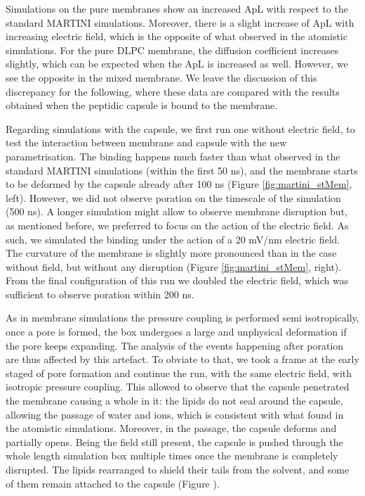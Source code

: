 Simulations on the pure membranes show an increased ApL with respect to the standard MARTINI simulations. Moreover, there is a slight increase of ApL with increasing electric field, which is the opposite of what observed in the atomistic simulations.
%
For the pure DLPC membrane, the diffusion coefficient increases slightly, which can be expected when the ApL is increased as well. However, we see the opposite in the mixed membrane. We leave the discussion of this discrepancy for the following, where these data are compared with the results obtained when the peptidic capsule is bound to the membrane.

Regarding simulations with the capsule, we first run one without electric field, to test the interaction between membrane and capsule with the new parametrisation. The binding happens much faster than what observed in the standard MARTINI simulations (within the first 50 ns), and the membrane starts to be deformed by the capsule already after 100 ns (Figure \ref{fig:martini_stMem}, left). However, we did not observe poration on the timescale of the simulation (500 ns).
%
A longer simulation might allow to observe membrane disruption but, as mentioned before, we preferred to focus on the action of the electric field. As such, we simulated the binding under the action of a 20 mV/nm electric field. The curvature of the membrane is slightly more pronounced than in the case without field, but without any disruption (Figure \ref{fig:martini_stMem}, right).
From the final configuration of this run we doubled the electric field, which was sufficient to observe poration within 200 ns.

As in membrane simulations the pressure coupling is performed semi isotropically, once a pore is formed, the box undergoes a large and unphysical deformation if the pore keeps expanding. The analysis of the events happening after poration are thus affected by this artefact.
%
To obviate to that, we took a frame at the early staged of pore formation and continue the run, with the same electric field, with isotropic pressure coupling. This allowed to observe that the capsule penetrated the membrane causing a whole in it: the lipids do not seal around the capsule, allowing the passage of water and ions, which is consistent with what found in the atomistic simulations. Moreover, in the passage, the capsule deforms and partially opens.
%
Being the field still present, the capsule is pushed through the whole length simulation box multiple times once the membrane is completely disrupted. The lipids rearranged to shield their tails from the solvent, and some of them remain attached to the capsule (Figure \label{fig:martini_poration}).

